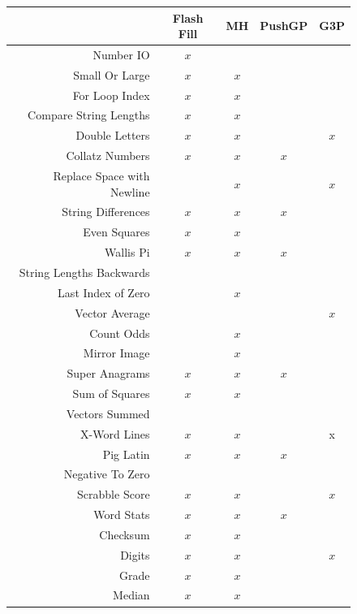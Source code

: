 \begin{figure}
\begin{tabular}{ r | c c c c }
	& Flash Fill & MH & PushGP & G3P \\
	\hline
	Number IO & $x$ & \checkmark & \checkmark & \checkmark \\
	Small Or Large & $x$ & $x$ & \checkmark & \checkmark \\
	For Loop Index & $x$ & $x$ & \checkmark & \checkmark \\
	Compare String Lengths & $x$ & $x$ & \checkmark & \checkmark \\
	Double Letters & $x$ & $x$ & \checkmark & $x$ \\
	Collatz Numbers & $x$ & $x$ & $x$ \\
	Replace Space with Newline &   & $x$ & \checkmark & $x$ \\
	String Differences & $x$ & $x$ & $x$ \\
	Even Squares & $x$ & $x$ & \checkmark & \checkmark \\
	Wallis Pi & $x$ & $x$ & $x$ \\
	String Lengths Backwards &   & \checkmark  & \checkmark & \checkmark \\
	Last Index of Zero &  & $x$ & \checkmark & \checkmark \\
	Vector Average &  & \checkmark & \checkmark & $x$ \\
	Count Odds &  & $x$ & \checkmark & \checkmark \\
	Mirror Image &  & $x$ & \checkmark & \checkmark \\
	Super Anagrams & $x$ & $x$ & $x$ & \checkmark \\
	Sum of Squares & $x$ & $x$ & \checkmark & \checkmark \\
	Vectors Summed &  & \checkmark & \checkmark & \checkmark \\
	X-Word Lines & $x$ & $x$ & \checkmark & x \\
	Pig Latin & $x$ & $x$ & $x$  \\
	Negative To Zero &  & \checkmark & \checkmark & \checkmark \\
	Scrabble Score & $x$ & $x$ & \checkmark & $x$ \\
	Word Stats & $x$ & $x$ & $x$ \\
	Checksum & $x$ & $x$ & \checkmark \\
	Digits & $x$ & $x$ & \checkmark & $x$ \\
	Grade & $x$ & $x$ & \checkmark & \checkmark  \\
	Median & $x$ & $x$ & \checkmark & \checkmark \\

\end{tabular}
\end{figure}

